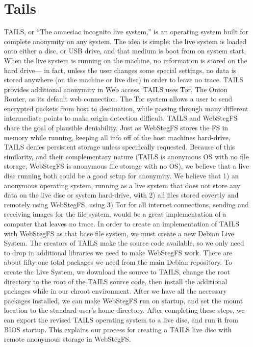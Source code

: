 \documentclass[12pt,journal,compsoc]{IEEEtran}
\begin{document}


\section{Tails}

TAILS, or ``The amnesiac incognito live system,'' is an operating system built for complete anonymity on any system. The idea is simple: the live system is loaded onto either a disc, or USB drive, and that medium is boot from on system start. When the live system is running on the machine, no information is stored on the hard drive--- in fact, unless the user changes some special settings, no data is stored anywhere (on the machine or live disc) in order to leave no trace. TAILS provides additional anonymity in Web access. TAILS uses Tor, The Onion Router, as its default web connection. The Tor system allows a user to send encrypted packets from host to destination, while passing through many different intermediate points to make origin detection difficult. 
TAILS and WebStegFS share the goal of plausible deniability. Just as WebStegFS stores the FS in memory while running, keeping all info off of the host machines hard-drive, TAILS denies persistent storage unless specifically requested. Because of this similarity, and their complementary nature (TAILS is anonymous OS with no file storage, WebStegFS is anonymous file storage with no OS), we believe that a live disc running both could be a good setup for anonymity. We believe that 1) an anonymous operating system, running as a live system that does not store any data on the live disc or system hard-drive, with 2) all files stored covertly and remotely using WebStegFS, using 3) Tor for all internet connections, sending and receiving images for the file system, would be a great implementation of a computer that leaves no trace. 
In order to create an implementation of TAILS with WebStegFS as that base file system, we must create a new Debian Live System. The creators of TAILS make the source code available, so we only need to drop in additional libraries we need to make WebStegFS work. There are about fifty-one total packages we need from the main Debian repository. To create the Live System, we download the source to TAILS, change the root directory to the root of the TAILS source code, then install the additional packages while in our chroot environment. After we have all the necessary packages installed, we can make WebStegFS run on startup, and set the mount location to the standard user's home directory. After completing these steps, we can export the revised TAILS operating system to a live disc, and run it from BIOS startup. This explains our process for creating a TAILS live disc with remote anonymous storage in WebStegFS.
\end{document}
